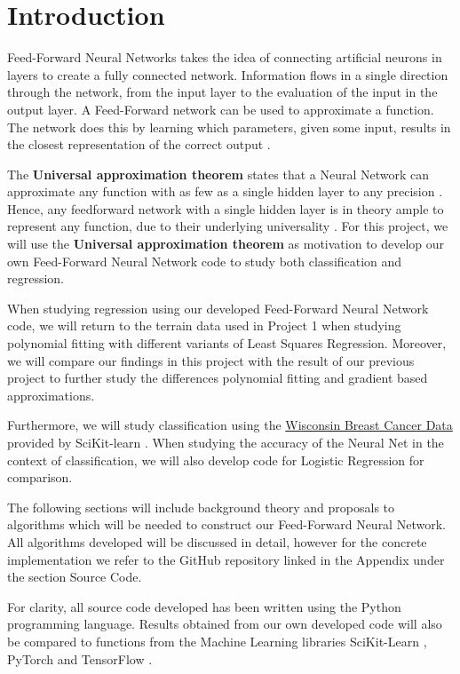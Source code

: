 \documentclass
[twocolumn,
secnumarabic,
nobibnotes,
aps,
prl,
reprint,
groupedaddress,
amsmath,
amssymb
]{revtex4-2}
\begin{document}
\section{Introduction}
Feed-Forward Neural Networks takes the idea of connecting artificial neurons in layers to create a fully connected network. Information flows in a single direction through the network, from the input layer to the evaluation of the input in the output layer. A Feed-Forward network can be used to approximate a function. The network does this by learning which parameters, given some input, results in the closest representation of the correct output \cite{Goodfellow2016}.

The \textbf{Universal approximation theorem} states that a Neural Network can approximate any function with as few as a single hidden layer to any precision \cite{Hornik1989, Cybenko1989}. Hence, any feedforward network with a single hidden layer is in theory ample to represent any function, due to their underlying universality \cite{Nielsen2015}. For this project, we will use the \textbf{Universal approximation theorem} as motivation to develop our own Feed-Forward Neural Network code to study both classification and regression.

When studying regression using our developed Feed-Forward Neural Network code, we will return to the terrain data used in Project 1 when studying polynomial fitting with different variants of Least Squares Regression. Moreover, we will compare our findings in this project with the result of our previous project to further study the differences polynomial fitting and gradient based approximations.

Furthermore, we will study classification using the \href{https://www.kaggle.com/uciml/breast-cancer-wisconsin-data}{Wisconsin Breast Cancer Data} provided by SciKit-learn \cite{scikit-learn}. When studying the accuracy of the Neural Net in the context of classification, we will also develop code for Logistic Regression for comparison.

The following sections will include background theory and proposals to algorithms which will be needed to construct our Feed-Forward Neural Network. All algorithms developed will be discussed in detail, however for the concrete implementation we refer to the GitHub repository linked in the Appendix under the section Source Code.

For clarity, all source code developed has been written using the Python programming language. Results obtained from our own developed code will also be compared to functions from the Machine Learning libraries SciKit-Learn \cite{scikit-learn}, PyTorch \cite{paszke2019} and TensorFlow \cite{tensorflow2015-whitepaper}.
\end{document}
